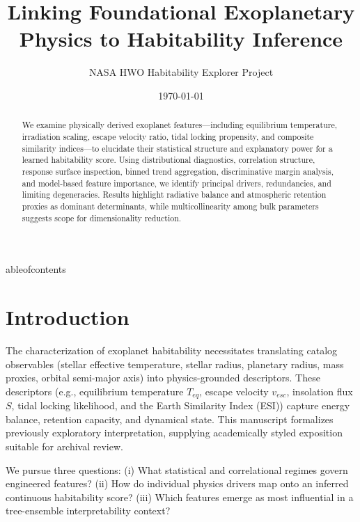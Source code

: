 \documentclass[11pt,a4paper]{article}
\title{Linking Foundational Exoplanetary Physics to Habitability Inference}
\author{NASA HWO Habitability Explorer Project}
\date{\today}
\begin{document}
\maketitle
\begin{abstract}
We examine physically derived exoplanet features---including equilibrium temperature, irradiation scaling, escape velocity ratio, tidal locking propensity, and composite similarity indices---to elucidate their statistical structure and explanatory power for a learned habitability score. Using distributional diagnostics, correlation structure, response surface inspection, binned trend aggregation, discriminative margin analysis, and model-based feature importance, we identify principal drivers, redundancies, and limiting degeneracies. Results highlight radiative balance and atmospheric retention proxies as dominant determinants, while multicollinearity among bulk parameters suggests scope for dimensionality reduction.
\end{abstract}
	ableofcontents\newpage

\section{Introduction}
The characterization of exoplanet habitability necessitates translating catalog observables (stellar effective temperature, stellar radius, planetary radius, mass proxies, orbital semi-major axis) into physics-grounded descriptors. These descriptors (e.g., equilibrium temperature $T_{eq}$, escape velocity $v_{esc}$, insolation flux $S$, tidal locking likelihood, and the Earth Similarity Index (ESI)) capture energy balance, retention capacity, and dynamical state. This manuscript formalizes previously exploratory interpretation, supplying academically styled exposition suitable for archival review.

We pursue three questions: (i) What statistical and correlational regimes govern engineered features? (ii) How do individual physics drivers map onto an inferred continuous habitability score? (iii) Which features emerge as most influential in a tree-ensemble interpretability context?
\end{document}
